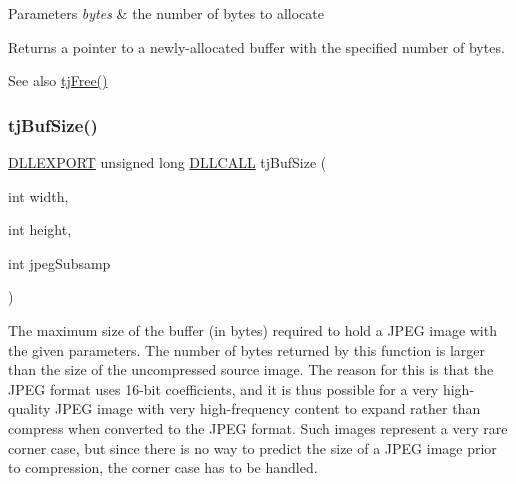 \begin{DoxyParams}{Parameters}
{\em bytes} & the number of bytes to allocate\\
\hline
\end{DoxyParams}
\begin{DoxyReturn}{Returns}
a pointer to a newly-\/allocated buffer with the specified number of bytes.
\end{DoxyReturn}
\begin{DoxySeeAlso}{See also}
\hyperlink{group___turbo_j_p_e_g_ga8c4a1231dc06a450514c835f6471f137}{tj\+Free()} 
\end{DoxySeeAlso}
\mbox{\label{group___turbo_j_p_e_g_gaccc5bca7f12fcdcc302e6e1c6d4b311b}} 
\subsubsection{\texorpdfstring{tj\+Buf\+Size()}{tjBufSize()}}
{\footnotesize\ttfamily \hyperlink{turbojpeg_8h_a808e08638be3cba36e36759e5b150de0}{D\+L\+L\+E\+X\+P\+O\+RT} unsigned long \hyperlink{turbojpeg_8h_a54b25836118bfac94a53a7b790f3ccb2}{D\+L\+L\+C\+A\+LL} tj\+Buf\+Size (\begin{DoxyParamCaption}\item[{int}]{width,  }\item[{int}]{height,  }\item[{int}]{jpeg\+Subsamp }\end{DoxyParamCaption})}

The maximum size of the buffer (in bytes) required to hold a J\+P\+EG image with the given parameters. The number of bytes returned by this function is larger than the size of the uncompressed source image. The reason for this is that the J\+P\+EG format uses 16-\/bit coefficients, and it is thus possible for a very high-\/quality J\+P\+EG image with very high-\/frequency content to expand rather than compress when converted to the J\+P\+EG format. Such images represent a very rare corner case, but since there is no way to predict the size of a J\+P\+EG image prior to compression, the corner case has to be handled.


